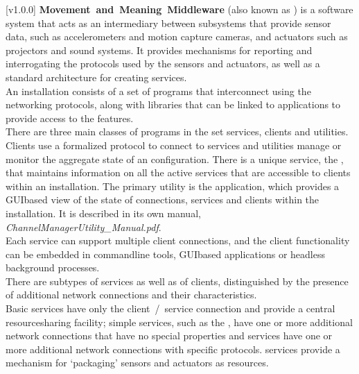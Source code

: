 [v1.0.0]
\textbf{Movement~and~Meaning~Middleware} (also known as \mplusm) is a software system
that acts as an intermediary between subsystems that provide sensor data, such as
accelerometers and motion capture cameras, and actuators such as projectors and sound
systems.
It provides mechanisms for reporting and interrogating the protocols used by the sensors
and actuators, as well as a standard architecture for creating services.\\

An \mplusm{} installation consists of a set of programs that interconnect using the
 networking
protocols, along with libraries that can be linked to applications to provide access to
the \mplusm{} features.\\

There are three main classes of programs in the set \longDash{} services, clients and
utilities.
Clients use a formalized protocol to connect to services and utilities manage or monitor
the aggregate state of an \mplusm{} configuration.
There is a unique service, the , that maintains
information on all the active services that are accessible to clients within an \mplusm{}
installation.
The primary utility is the \emph{\CMU} application, which provides a GUI\longDash{}based
view of the state of connections, services and clients within the installation.
It is described in its own manual, \emph{ChannelManagerUtility\_Manual.pdf}.\\

Each service can support multiple client connections, and the client functionality can be
embedded in command\longDash{}line tools, GUI\longDash{}based applications or headless
background processes.\\

There are subtypes of services as well as of clients, distinguished by the presence of
additional \yarp{} network connections and their characteristics.\\

Basic services have only the client~/~service \yarp{} connection and provide a central
resource\longDash{}sharing facility; simple services, such as the
, have one or more additional \yarp{} network
connections that have no special properties and  services have one or more
additional \yarp{} network connections with specific protocols.
 services provide a mechanism for `packaging' sensors and actuators as
\mplusm{} resources.\\

